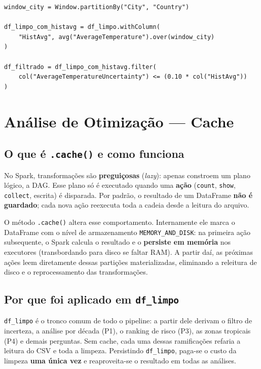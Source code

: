 \begin{lstlisting}[caption={Definição da janela por cidade e filtro de incerteza relativa.},label={lst:incerteza}]
window_city = Window.partitionBy("City", "Country")

df_limpo_com_histavg = df_limpo.withColumn(
    "HistAvg", avg("AverageTemperature").over(window_city)
)

df_filtrado = df_limpo_com_histavg.filter(
    col("AverageTemperatureUncertainty") <= (0.10 * col("HistAvg"))
)
\end{lstlisting}

\section{Análise de Otimização --- Cache}
\label{sec:cache}

\subsection{O que é \texttt{.cache()} e como funciona}

No Spark, transformações são \textbf{preguiçosas} (\textit{lazy}): apenas constroem um
plano lógico, a DAG. Esse plano só é executado quando uma \textbf{ação} (\texttt{count},
\texttt{show}, \texttt{collect}, escrita) é disparada. Por padrão, o resultado de um
DataFrame \textbf{não é guardado}; cada nova ação reexecuta toda a cadeia desde a leitura
do arquivo.

O método \texttt{.cache()} altera esse comportamento. Internamente ele marca o DataFrame
com o nível de armazenamento \texttt{MEMORY\_AND\_DISK}: na primeira ação subsequente, o
Spark calcula o resultado e o \textbf{persiste em memória} nos executores (transbordando
para disco se faltar RAM). A partir daí, as próximas ações leem diretamente dessas
partições materializadas, eliminando a releitura de disco e o reprocessamento das
transformações.

\subsection{Por que foi aplicado em \texttt{df\_limpo}}

\texttt{df\_limpo} é o tronco comum de todo o pipeline: a partir dele derivam o filtro de
incerteza, a análise por década (P1), o ranking de risco (P3), as zonas tropicais (P4) e
demais perguntas. Sem cache, cada uma dessas ramificações refaria a leitura do CSV e toda
a limpeza. Persistindo \texttt{df\_limpo}, paga-se o custo da limpeza \textbf{uma única
vez} e reaproveita-se o resultado em todas as análises.

